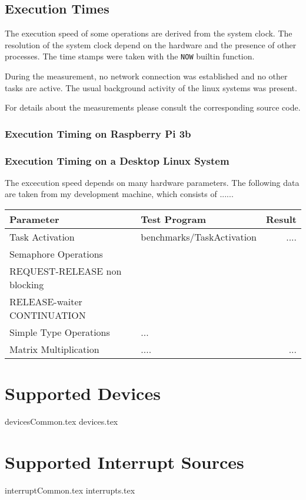 \documentclass[10pt]{scrbook}
\begin{document}
\section{Execution Times}
The execution speed of some operations are derived from the system clock.
The resolution of the system clock depend on the hardware and the 
presence of other processes.
The time stamps were taken with the \texttt{NOW} builtin function.

During the measurement, no network connection was established and no
other tasks are active. The usual background activity of the linux
systems was present.

For details about the measurements please consult the corresponding
source code.

\subsection{Execution Timing on Raspberry Pi 3b}

\subsection{Execution Timing on a Desktop Linux System}
The excecution speed depends on many hardware parameters. 
The following data are taken from my development machine, which consists of
......

\begin{tabular}{|p{5cm}|l|r|}
\hline
Parameter & Test Program & Result \\
\hline
Task Activation & benchmarks/TaskActivation & ....\\
\hline
Semaphore Operations &  & \\
REQUEST-RELEASE non blocking & & \\
RELEASE-waiter CONTINUATION & & \\

\hline
Simple Type Operations & ... & \\
\hline
Matrix Multiplication & .... & ...\\
\hline
\end{tabular}



\chapter{Supported Devices}
{devicesCommon.tex}
{devices.tex}

\chapter{Supported Interrupt Sources}
{interruptCommon.tex}
{interrupts.tex}
\end{document}
